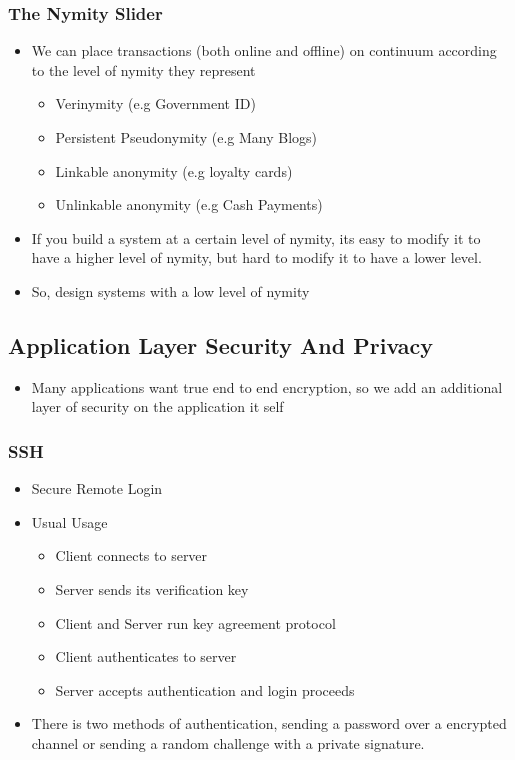 \documentclass[twoside]{article}
\begin{document}
\subsubsection{The Nymity Slider}
\begin{itemize}
\item We can place transactions (both online and offline) on continuum according to the level of nymity they represent 
\begin{itemize}
\item Verinymity (e.g Government ID)
\item Persistent Pseudonymity (e.g Many Blogs)
\item Linkable anonymity (e.g loyalty cards)
\item Unlinkable anonymity (e.g Cash Payments)
\end{itemize}
\item If you build a system at a certain level of nymity, its easy to modify it to have a higher level of nymity, but hard to modify it to have a lower level. 
\item So, design systems with a low level of nymity
\end{itemize}
\subsection{Application Layer Security And Privacy}
\begin{itemize}
\item Many applications want true end to end encryption, so we add an additional layer of security on the application it self
\end{itemize}
\subsubsection{SSH}
\begin{itemize}
\item Secure Remote Login
\item Usual Usage 
\begin{itemize}
\item Client connects to server
\item Server sends its verification key
\item Client and Server run key agreement protocol
\item Client authenticates to server
\item Server accepts authentication and login proceeds
\end{itemize}
\item There is two methods of authentication, sending a password over a encrypted channel or sending a random challenge with a private signature.
\end{itemize}
\end{document}
